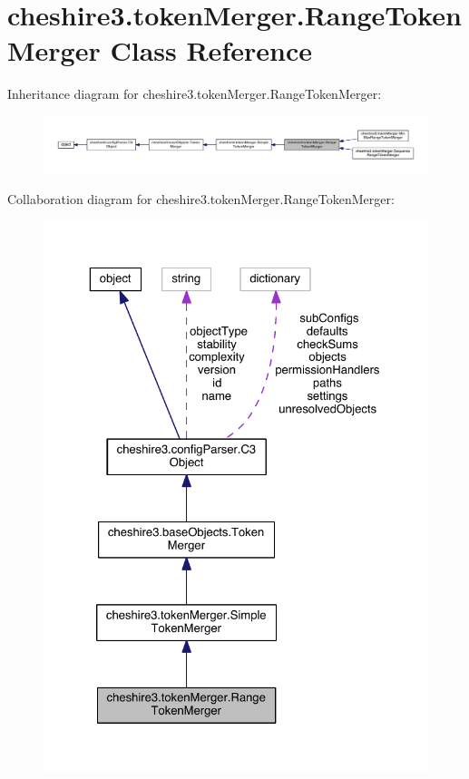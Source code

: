 \hypertarget{classcheshire3_1_1token_merger_1_1_range_token_merger}{\section{cheshire3.\-token\-Merger.\-Range\-Token\-Merger Class Reference}
\label{classcheshire3_1_1token_merger_1_1_range_token_merger}
}


Inheritance diagram for cheshire3.\-token\-Merger.\-Range\-Token\-Merger\-:
\nopagebreak
\begin{figure}[H]
\begin{center}
\leavevmode
\includegraphics[width=350pt]{classcheshire3_1_1token_merger_1_1_range_token_merger__inherit__graph}
\end{center}
\end{figure}


Collaboration diagram for cheshire3.\-token\-Merger.\-Range\-Token\-Merger\-:
\nopagebreak
\begin{figure}[H]
\begin{center}
\leavevmode
\includegraphics[width=325pt]{classcheshire3_1_1token_merger_1_1_range_token_merger__coll__graph}
\end{center}
\end{figure}

